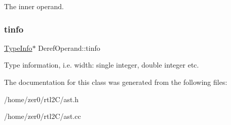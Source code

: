 The inner operand. \mbox{\label{class_deref_operand_a8ed3dec1ff7eef19af757a6826878f5e}} 
\subsubsection{\texorpdfstring{tinfo}{tinfo}}
{\footnotesize\ttfamily \hyperlink{class_type_info}{Type\+Info}$\ast$ Deref\+Operand\+::tinfo\hspace{0.3cm}{\ttfamily [protected]}}

Type information, i.\+e. width\+: single integer, double integer etc. 

The documentation for this class was generated from the following files\+:\begin{DoxyCompactItemize}
\item 
/home/zer0/rtl2\+C/ast.\+h\item 
/home/zer0/rtl2\+C/ast.\+cc\end{DoxyCompactItemize}
